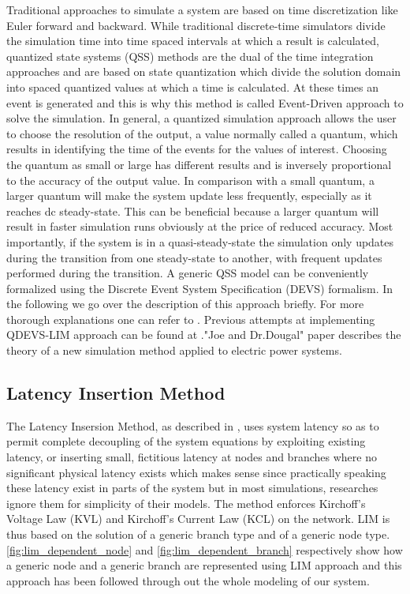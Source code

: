 \documentclass{article}
\theoremstyle{scsthe}
\begin{document}
Traditional approaches to simulate a system are based on time discretization like Euler forward and backward. While traditional discrete-time simulators divide the simulation time into time spaced intervals at which a result is calculated, quantized state systems (QSS) methods are the dual of the time integration approaches and are based on state quantization which divide the solution domain into spaced quantized values at which a time is calculated. At these times an event is generated and this is why this method is called Event-Driven approach to solve the simulation. In general, a quantized simulation approach allows the user to choose the resolution of the output, a value normally called a quantum, which results in identifying the time of the events for the values of interest. Choosing the quantum as small or large has different results and is inversely proportional to the accuracy of the output value. In comparison with a small quantum, a larger quantum will make the system update less frequently, especially as it reaches dc steady-state. This can be beneficial because a larger quantum will result in faster simulation runs obviously at the price of reduced accuracy. Most importantly, if the system is in a quasi-steady-state the simulation only updates during the transition from one steady-state to another, with frequent updates performed during the transition. A generic QSS model can be conveniently formalized using the Discrete Event System Specification (DEVS) formalism. In the following we go over the description of this approach briefly. For more thorough explanations one can refer to  \cite{cellier2006continuous}. Previous attempts at implementing QDEVS-LIM approach can be found at  \cite{benigni1}."Joe and Dr.Dougal" paper describes the theory of a new simulation method applied to electric power systems.

\subsection{Latency Insertion Method} 

The Latency Insersion Method, as described in \cite{schutt1}, uses system latency so as to permit complete decoupling of the system equations by exploiting existing latency, or inserting small, fictitious latency at nodes and branches where no significant physical latency exists which makes sense since practically speaking these latency exist in parts of the system but in most simulations, researches ignore them for simplicity of their models. The method enforces  Kirchoff's Voltage Law (KVL) and Kirchoff's Current Law (KCL) on the network. LIM is thus based on the solution of a generic branch type and of a generic node type. \autoref{fig:lim_dependent_node} and \autoref{fig:lim_dependent_branch} respectively show how a generic node and a generic branch are represented using LIM approach and this approach has been followed through out the whole modeling of our system. 
\end{document}
